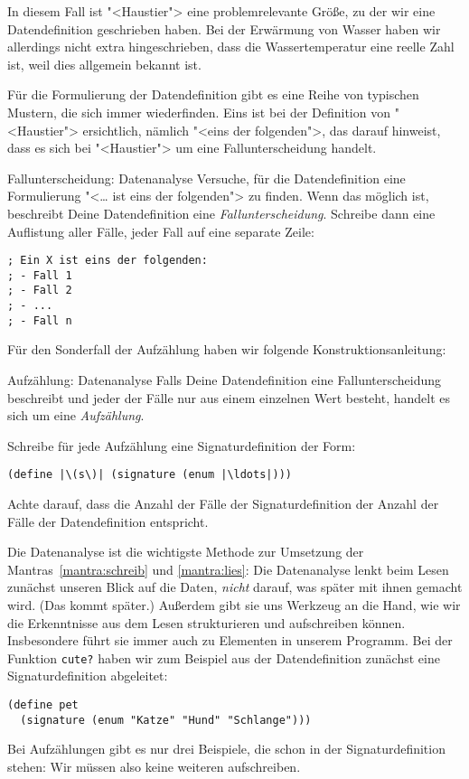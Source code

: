 In diesem Fall ist "<Haustier"> eine problemrelevante Größe, zu der
wir eine Datendefinition geschrieben haben.  Bei der Erwärmung von
Wasser haben wir allerdings nicht extra hingeschrieben, dass die
Wassertemperatur eine reelle Zahl ist, weil dies allgemein bekannt
ist.

Für die Formulierung der Datendefinition gibt es eine Reihe von
typischen Mustern, die sich immer wiederfinden.  Eins ist bei der
Definition von "<Haustier"> ersichtlich, nämlich "<eins der
folgenden">, das darauf hinweist, dass es sich bei "<Haustier"> um
eine Fallunterscheidung handelt.  

\begin{konstruktionsanleitung}{Fallunterscheidung: Datenanalyse}
  \label{ka:fallunterscheidung}
  Versuche, für die Datendefinition eine Formulierung "<\ldots{}
    ist eins der folgenden"> zu finden. Wenn das möglich ist, beschreibt
  Deine Datendefinition eine
  \textit{Fallunterscheidung}.  Schreibe
  dann eine Auflistung aller Fälle, jeder Fall auf eine separate
  Zeile:
  
\begin{lstlisting}
; Ein X ist eins der folgenden:
; - Fall 1
; - Fall 2
; - ...
; - Fall n
\end{lstlisting}
\end{konstruktionsanleitung}
%
Für den Sonderfall der Aufzählung haben wir folgende Konstruktionsanleitung:
%
\begin{konstruktionsanleitung}{Aufzählung: Datenanalyse}
  \label{ka:aufzaehlung}
  Falls Deine Datendefinition eine Fallunterscheidung beschreibt und
  jeder der Fälle nur aus einem einzelnen Wert besteht, handelt es
  sich um eine \textit{Aufzählung}.

  Schreibe für jede Aufzählung eine Signaturdefinition der Form:
\begin{lstlisting}
(define |\(s\)| (signature (enum |\ldots|)))
\end{lstlisting}
  Achte darauf, dass die Anzahl der Fälle der Signaturdefinition der
  Anzahl der Fälle der Datendefinition entspricht.
\end{konstruktionsanleitung}
%
Die Datenanalyse ist die wichtigste Methode zur Umsetzung der
Mantras~\ref{mantra:schreib} und \ref{mantra:lies}:
%
\mantraschreib*
%
\mantralies*
%
\noindent Die Datenanalyse lenkt beim Lesen zunächst unseren Blick auf die
Daten, \emph{nicht} darauf, was später mit ihnen gemacht wird.  (Das
kommt später.)  Außerdem gibt sie uns Werkzeug an die Hand, wie wir
die Erkenntnisse aus dem Lesen strukturieren und aufschreiben können.
Insbesondere führt sie immer auch zu Elementen in unserem Programm.
Bei der Funktion \lstinline{cute?} haben wir zum Beispiel aus der
Datendefinition zunächst eine Signaturdefinition abgeleitet:
%
\begin{lstlisting}
(define pet
  (signature (enum "Katze" "Hund" "Schlange")))
\end{lstlisting}
%
Bei Aufzählungen gibt es nur drei Beispiele, die schon in der
Signaturdefinition stehen: Wir müssen also keine weiteren
aufschreiben.

